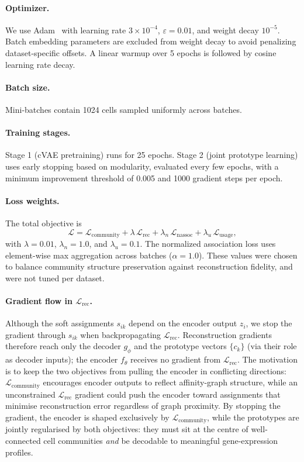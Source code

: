 \paragraph{Optimizer.}
We use Adam~\citep{adam} with learning rate $3 \times 10^{-4}$, $\varepsilon = 0.01$, and weight decay $10^{-5}$.
Batch embedding parameters are excluded from weight decay to avoid penalizing dataset-specific offsets.
A linear warmup over 5 epochs is followed by cosine learning rate decay.

\paragraph{Batch size.}
Mini-batches contain 1024 cells sampled uniformly across batches.

\paragraph{Training stages.}
Stage 1 (cVAE pretraining) runs for 25 epochs.
Stage 2 (joint prototype learning) uses early stopping based on modularity, evaluated every few epochs, with a minimum improvement threshold of 0.005 and 1000 gradient steps per epoch.

\paragraph{Loss weights.}
The total objective is
\[
\mathcal{L} = \mathcal{L}_{\text{community}} + \lambda\,\mathcal{L}_{\text{rec}} + \lambda_n\,\mathcal{L}_{\text{nassoc}} + \lambda_u\,\mathcal{L}_{\text{usage}},
\]
with $\lambda = 0.01$, $\lambda_n = 1.0$, and $\lambda_u = 0.1$.
The normalized association loss uses element-wise max aggregation across batches ($\alpha = 1.0$).
These values were chosen to balance community structure preservation against reconstruction fidelity, and were not tuned per dataset.

\paragraph{Gradient flow in $\mathcal{L}_{\text{rec}}$.}
Although the soft assignments $s_{ik}$ depend on the encoder output $z_i$, we stop the gradient through $s_{ik}$ when backpropagating $\mathcal{L}_{\text{rec}}$.
Reconstruction gradients therefore reach only the decoder $g_\phi$ and the prototype vectors $\{c_k\}$ (via their role as decoder inputs); the encoder $f_\theta$ receives no gradient from $\mathcal{L}_{\text{rec}}$.
The motivation is to keep the two objectives from pulling the encoder in conflicting directions: $\mathcal{L}_{\text{community}}$ encourages encoder outputs to reflect affinity-graph structure, while an unconstrained $\mathcal{L}_{\text{rec}}$ gradient could push the encoder toward assignments that minimise reconstruction error regardless of graph proximity.
By stopping the gradient, the encoder is shaped exclusively by $\mathcal{L}_{\text{community}}$, while the prototypes are jointly regularised by both objectives: they must sit at the centre of well-connected cell communities \emph{and} be decodable to meaningful gene-expression profiles.

